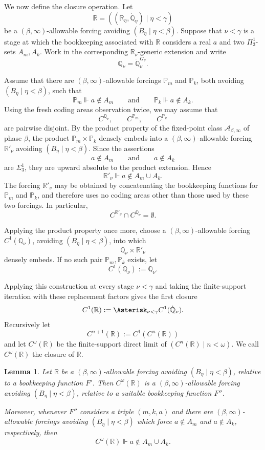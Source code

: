 \documentclass[a4paper,11pt]{article}
\newtheorem{lemma}[theorem]{Lemma}
\newcommand{\forceP}{\mathbb{P}}
\newcommand{\forceQ}{\mathbb{Q}}
\newcommand{\forceR}{\mathbb{R}}
\begin{document}
We now define the closure operation. Let
\[
\forceR=((\forceR_\eta,\dot{\forceQ}_\eta)\mid\eta<\gamma)
\]
be a $(\beta,\infty)$-allowable forcing avoiding $(B_\eta\mid\eta<\beta)$. Suppose that $\nu<\gamma$ is a stage at which the bookkeeping associated with $\forceR$ considers a real $a$ and two $\Pi^1_3$-sets $A_m,A_k$. Work in the corresponding $\forceR_\nu$-generic extension and write
\[
\forceQ_\nu=\dot{\forceQ}_\nu^{G_\nu}.
\]

Assume that there are $(\beta,\infty)$-allowable forcings $\forceP_m$ and $\forceP_k$, both avoiding $(B_\eta\mid\eta<\beta)$, such that
\[
\forceP_m\Vdash a\notin A_m
\qquad\text{and}\qquad
\forceP_k\Vdash a\notin A_k.
\]
Using the fresh coding areas observation twice, we may assume that
\[
C^{\forceQ_\nu},\qquad C^{\forceP_m},\qquad C^{\forceP_k}
\]
are pairwise disjoint. By the product property of the fixed-point class $\mathcal A_{\beta,\infty}$ of phase $\beta$, the product $\forceP_m\times\forceP_k$ densely embeds into a $(\beta,\infty)$-allowable forcing $\forceR'_\nu$ avoiding $(B_\eta\mid\eta<\beta)$. Since the assertions
\[
a\notin A_m
\qquad\text{and}\qquad
a\notin A_k
\]
are $\Sigma^1_3$, they are upward absolute to the product extension. Hence
\[
\forceR'_\nu\Vdash a\notin A_m\cup A_k.
\]
The forcing $\forceR'_\nu$ may be obtained by concatenating the bookkeeping functions for $\forceP_m$ and $\forceP_k$, and therefore uses no coding areas other than those used by these two forcings. In particular,
\[
C^{\forceR'_\nu}\cap C^{\forceQ_\nu}=\emptyset.
\]

Applying the product property once more, choose a $(\beta,\infty)$-allowable forcing $C^1(\forceQ_\nu)$, avoiding $(B_\eta\mid\eta<\beta)$, into which
\[
\forceQ_\nu\times\forceR'_\nu
\]
densely embeds. If no such pair $\forceP_m,\forceP_k$ exists, let
\[
C^1(\forceQ_\nu):=\forceQ_\nu.
\]

Applying this construction at every stage $\nu<\gamma$ and taking the finite-support iteration with these replacement factors gives the first closure
\[
C^1(\forceR):=
\Asterisk_{\nu<\gamma}C^1(\dot{\forceQ}_\nu).
\]
Recursively let
\[
C^{n+1}(\forceR):=C^1(C^n(\forceR))
\]
and let $C^\omega(\forceR)$ be the finite-support direct limit of $(C^n(\forceR)\mid n<\omega)$. We call $C^\omega(\forceR)$ the closure of $\forceR$.

\begin{lemma}\label{ClosureLemma}
Let $\forceR$ be a $(\beta,\infty)$-allowable forcing avoiding $(B_\eta\mid\eta<\beta)$, relative to a bookkeeping function $F'$. Then $C^\omega(\forceR)$ is a $(\beta,\infty)$-allowable forcing avoiding $(B_\eta\mid\eta<\beta)$, relative to a suitable bookkeeping function $F''$.

Moreover, whenever $F''$ considers a triple $(m,k,a)$ and there are $(\beta,\infty)$-allowable forcings avoiding $(B_\eta\mid\eta<\beta)$ which force $a\notin A_m$ and $a\notin A_k$, respectively, then
\[
C^\omega(\forceR)\Vdash a\notin A_m\cup A_k.
\]
\end{lemma}
\end{document}
